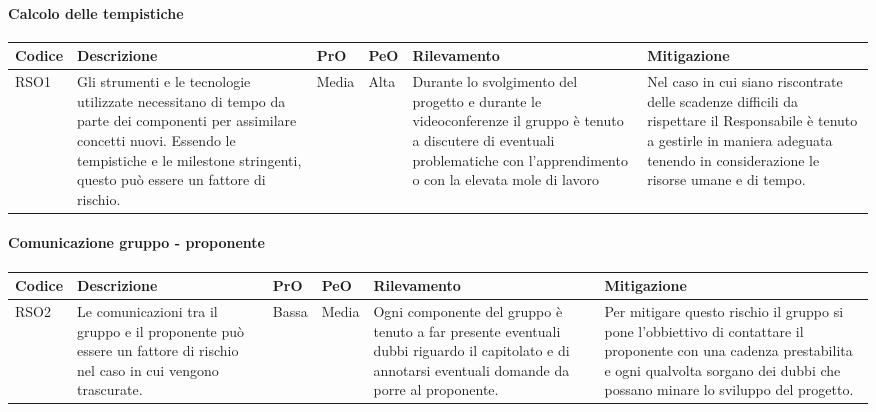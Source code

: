 \paragraph{Calcolo delle tempistiche}
\begin{center}

	\begin{longtable}{p{1cm}|p{4cm}|p{0.7cm}|p{0.7cm}|p{3cm}|p{4cm}}
		\arrayrulecolor{white}
		\hline
		\rowcolor{blue!20}
		\textbf{Codice} & 
		\textbf{Descrizione} &
		\textbf{PrO}  &
		\textbf{PeO}  &				        
		\textbf{Rilevamento} &
		\textbf{Mitigazione} \\
		\hline			
		RSO1 & Gli strumenti e le tecnologie utilizzate necessitano di tempo da parte dei componenti per assimilare concetti nuovi. Essendo le tempistiche e le milestone stringenti, questo può essere un fattore di rischio. & Media & Alta & Durante lo svolgimento del progetto e durante le videoconferenze il gruppo è tenuto a discutere di eventuali problematiche con l'apprendimento o con la elevata mole di lavoro & Nel caso in cui siano riscontrate delle scadenze difficili da rispettare il Responsabile è tenuto a gestirle in maniera adeguata tenendo in considerazione le risorse umane e di tempo. \\
		\end{longtable}
\end{center}
\paragraph{Comunicazione gruppo - proponente}
\begin{center}

	\begin{longtable}{p{1cm}|p{4cm}|p{0.7cm}|p{0.7cm}|p{3cm}|p{4cm}}
		\arrayrulecolor{white}
		\hline
		\rowcolor{blue!20}
		\textbf{Codice} & 
		\textbf{Descrizione} &
		\textbf{PrO}  &
		\textbf{PeO}  &				        
		\textbf{Rilevamento} &
		\textbf{Mitigazione} \\
		\hline	
		RSO2 & Le comunicazioni tra il gruppo e il proponente può essere un fattore di rischio nel caso in cui vengono trascurate. & Bassa & Media & Ogni componente del gruppo è tenuto a far presente eventuali dubbi riguardo il capitolato e di annotarsi eventuali domande da porre al proponente. & Per mitigare questo rischio il gruppo si pone l'obbiettivo di contattare il proponente con una cadenza prestabilita e ogni qualvolta sorgano dei dubbi che possano minare lo sviluppo del progetto.  \\
		\end{longtable}
\end{center}
\newpage
